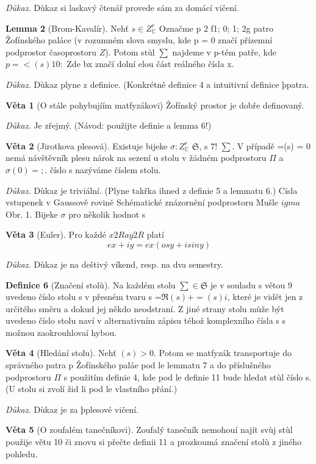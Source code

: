 \documentclass[12pt,a4paper]{article}
\begin{document}
{\textit{Důkaz.}
Dùkaz si laskavý čtenář provede sám za domácí vičení.


\textbf{Lemma 2}
(Brom-Kavalír).
Nehť $s \in Z^r_{\mathds{C}}$
Označme p 2 f1; 0; 1; 2g patro Žofínského
paláce (v rozumném slova smyslu, kde p = 0 značí přízemní podprostor časoprostoru $Z$).
Potom stùl $\sum$ najdeme v p-tém patře, kde
$p =<(s)10:$
Zde bx značí dolní elou část reálného čísla x.

\textit{Důkaz.}
Dùkaz plyne z definice. (Konkrétně definice 4 a intuitivní definice þpatra.


\textbf{Věta 1}
(O stále pohybujíím matfyzákovi)
Žofínský prostor je dobře definovaný.

\textit{Důkaz.}
Je zřejmý. (Návod: použijte definie a lemma 6!)


\textbf{Věta 2}
(Jirotkova plesová).
Existuje bijeke $\sigma : Z^r_{\mathds{C}}$
$\mathfrak{S}$, s 7! $\sum$. V případě =(s) = 0
nemá návštěvník plesu nárok na sezení u stolu v žádném podprostoru $\Pi$ a $\sigma(0) = ;$. číslo s
nazýváme číslem stolu.

\textit{Důkaz.}
Dùkaz je triviální. (Plyne takřka ihned z definie 5 a lemmatu 6.)%
Císla vstupenek v Gaussově rovině  Schématické znázornění podprostoru Mušle %
$igma$
Obr. 1. Bijeke $\sigma$ pro několik hodnot s


\textbf{Věta 3} (Euler). Pro každé $x 2 R a y 2 R$ platí
$$
e x+iy = e x (os y + i sin y) 
$$

\textit{Důkaz.}
Dùkaz je na deštivý víkend, resp. na dva semestry.


\textbf{Definice 6} (Značení stolù). Na každém stolu $\sum \in \mathfrak{S}$ je v souladu s větou 9 uvedeno
číslo stolu s v přesném tvaru s =$\Re(s) + =(s) i$, které je vidět jen z určitého směru a dokud
jej někdo neodstraní. Z jiné strany stolu mùže být uvedeno číslo stolu naví v alternativním
zápisu téhož komplexního čísla s s možnou zaokrouhlovaí hybou.


\textbf{Věta 4} (Hledání stolu). Nehť $(s) > 0$. Potom se matfyzák transportuje do správného
patra p Žofínského paláe pod le lemmatu 7 a do příslušného podprostoru $\Pi$ s použitím
definie 4, kde pod le definie 11 bude hledat stùl číslo s. (U stolu si zvolí žid li pod le
vlastního přání.)

\textit{Důkaz.}
Dùkaz je za þplesové vičení.


\textbf{Věta 5} (O zoufalém tanečníkovi). Zoufalý tanečník nemohouí najít svùj stùl použije
větu 10 či znovu si přečte definii 11 a prozkoumá značení stolù z jiného pohledu.

}
\end{document}
